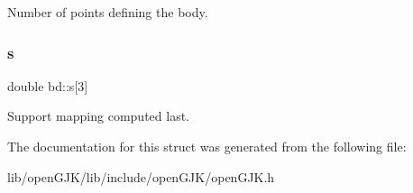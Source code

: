 Number of points defining the body. \mbox{\label{structbd_a68a6f689c5ced6af14d1c1dff58fa559}} 
\subsubsection{\texorpdfstring{s}{s}}
{\footnotesize\ttfamily double bd\+::s\mbox{[}3\mbox{]}}

Support mapping computed last. 

The documentation for this struct was generated from the following file\+:\begin{DoxyCompactItemize}
\item 
lib/open\+G\+J\+K/lib/include/open\+G\+J\+K/open\+G\+J\+K.\+h\end{DoxyCompactItemize}
